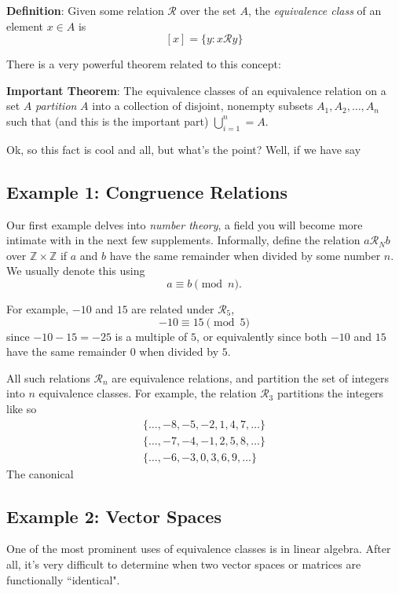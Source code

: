 \documentclass{article}
\begin{document}
    \vspace{2mm}
    \textbf{Definition}: Given some relation $\mathcal{R}$ over the set $A$, the \textit{equivalence class} of an element $x \in A$ is $$[x] = \{y : x \mathcal{R} y\}$$

    There is a very powerful theorem related to this concept:

    \vspace{2mm}
    \textbf{Important Theorem}: The equivalence classes of an equivalence relation on a set $A$ \textit{partition} $A$ into a collection of disjoint, nonempty subsets $A_{1}, A_{2}, \dots, A_{n}$ such that (and this is the important part) $\bigcup _{i = 1}^{n} = A$.


    \vspace{2mm}
    Ok, so this fact is cool and all, but what's the point? Well, if we have say 

    \subsection*{Example 1: Congruence Relations}
        Our first example delves into \textit{number theory}, a field you will become more intimate with in the next few supplements. Informally, define the relation $a\mathcal{R}_{N}b$ over $\mathbb{Z} \times \mathbb{Z}$ if $a$ and $b$ have the same remainder when divided by some number $n$. We usually denote this using $$a \equiv b \pmod{n}.$$ 

        For example, $-10$ and $15$ are related under $\mathcal{R}_{5}$, $$-10 \equiv 15 \pmod{5}$$ since $-10 - 15 = -25$ is a multiple of $5$, or equivalently since both $-10$ and $15$ have the same remainder $0$ when divided by $5$.
        
        
        
        All such relations $\mathcal{R}_{n}$ are equivalence relations, and partition the set of integers into $n$ equivalence classes. For example, the relation $\mathcal{R}_{3}$ partitions the integers like so
        \begin{gather}
            \{\dots, -8, -5, -2, 1, 4, 7, \dots\} \\
            \{\dots, -7, -4, -1, 2, 5, 8, \dots\} \\
            \{\dots, -6, -3, 0, 3, 6, 9, \dots\}
        \end{gather}
        The canonical 


    \subsection*{Example 2: Vector Spaces}
        One of the most prominent uses of equivalence classes is in linear algebra. After all, it's very difficult to determine when two vector spaces or matrices are functionally ``identical". 
\end{document}

